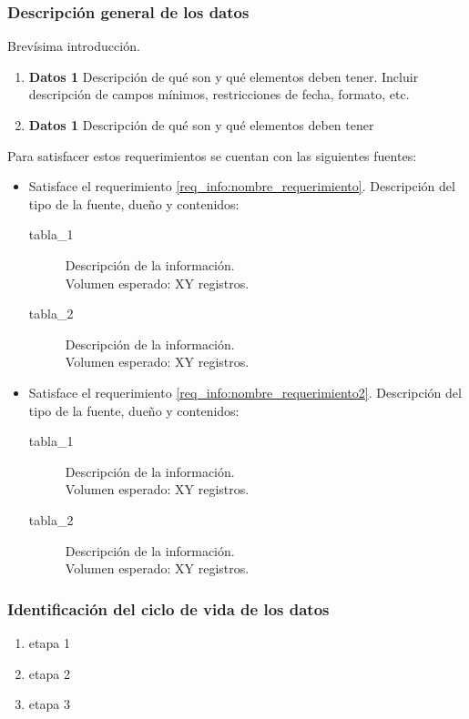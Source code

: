 \subsubsection{Descripción general de los datos}
Brevísima introducción.
\begin{enumerate}[label=RI\arabic*] %
  \item \textbf{Datos 1}
    \label{req_info:nombre_requerimiento} Descripción de qué son y qué elementos deben tener. Incluir descripción de campos mínimos, restricciones de fecha, formato, etc.
  \item \textbf{Datos 1}
    \label{req_info:nombre_requerimiento2} Descripción de qué son y qué elementos deben tener

\end{enumerate}
Para satisfacer estos requerimientos se cuentan con las siguientes fuentes:
\begin{itemize}
  \item {} Satisface el requerimiento \ref{req_info:nombre_requerimiento}.
    Descripción del tipo de la fuente, dueño y contenidos:
    \begin{description}
      \item[tabla_1] Descripción de la información.\\
        Volumen esperado: XY registros.
      \item[tabla_2] Descripción de la información.\\
        Volumen esperado: XY registros.
    \end{description}
  \item {} Satisface el requerimiento
    \ref{req_info:nombre_requerimiento2}.
    Descripción del tipo de la fuente, dueño y contenidos:
    \begin{description}
      \item[tabla_1] Descripción de la información.\\
        Volumen esperado: XY registros.
      \item[tabla_2] Descripción de la información.\\
        Volumen esperado: XY registros.
    \end{description}
\end{itemize}

\subsubsection{Identificación del ciclo de vida de los datos}
\begin{enumerate}
  \item etapa 1
  \item etapa 2
  \item etapa 3
  \end{enumerate}

